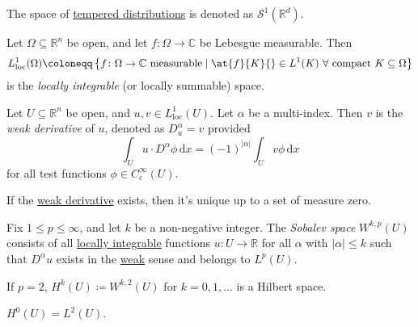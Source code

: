 \begin{notation}
	The space of \hyperref[def:tempered-distribution]{tempered distributions} is denoted as \(\mathcal{S} ^1(\mathbb{R} ^d)\).
\end{notation}

\begin{definition}\label{def:locally-integrable}
	Let \(\Omega \subseteq \mathbb{R} ^n\) be open, and let \(f\colon \Omega \to \mathbb{C} \) be Lebesgue measurable. Then
	\[
		L^1_{\text{loc} }(\Omega ) \coloneqq \left\{ f\colon \Omega \to \mathbb{C} \text{ measurable} \mid \at{f}{K}{} \in L^1(K)\ \forall \text{ compact } K \subseteq \Omega \right\}
	\]
	is the \emph{locally integrable} (or locally summable) space.
\end{definition}

\begin{definition}\label{def:weak-derivative}
	Let \(U \subseteq \mathbb{R} ^n\) be open, and \(u, v\in L^1_{\text{loc} }(U)\). Let \(\alpha\) be a multi-index. Then \(v\) is the \emph{weak derivative} of \(u\), denoted as \(D^\alpha _u = v\) provided
	\[
		\int _U u\cdot D^\alpha \phi \,\mathrm{d} x = (-1)^{\vert \alpha \vert} \int _U v \phi \,\mathrm{d} x
	\]
	for all test functions \(\phi \in C^{\infty} _c(U)\).
\end{definition}

\begin{remark}
	If the \hyperref[def:weak-derivative]{weak derivative} exists, then it's unique up to a set of measure zero.
\end{remark}

\begin{definition}\label{def:Sobalev-space}
	Fix \(1 \leq p \leq \infty \), and let \(k\) be a non-negative integer. The \emph{Sobalev space} \(W^{k, p}(U)\) consists of all \hyperref[def:locally-integrable]{locally integrable} functions \(u\colon U \to \mathbb{R} \) for all \(\alpha \) with \(\vert \alpha \vert \leq k\) such that \(D^\alpha u\) exists in the \hyperref[def:weak-derivative]{weak} sense and belongs to \(L^p(U)\).
\end{definition}

\begin{remark}
	If \(p = 2\), \(H^k(U) \coloneqq W^{k, 2}(U)\) for \(k = 0, 1, \dots \) is a Hilbert space.
\end{remark}

\begin{eg}
	\(H^0(U) = L^2(U)\).
\end{eg}

